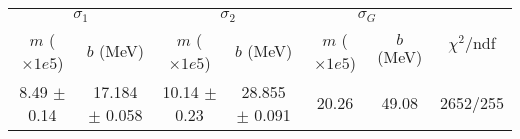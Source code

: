 \begin{tabular}{cc|cc|cc||c}
\multicolumn{2}{c|}{$\sigma_1$} & \multicolumn{2}{|c}{$\sigma_2$} & \multicolumn{2}{|c}{$\sigma_G$}  & \multirow{2}{*}{$\chi^2/$ndf}\\
$m$ ($\times1e5$) & $b$ (MeV) & $m$ ($\times1e5$) & $b$ (MeV) & $m$ ($\times1e5$) & $b$ (MeV) & \\
\hline
8.49 $\pm$ 0.14 & 17.184 $\pm$ 0.058 & 10.14 $\pm$ 0.23 & 28.855 $\pm$ 0.091 & 20.26 & 49.08 & 2652/255\\
\end{tabular}
